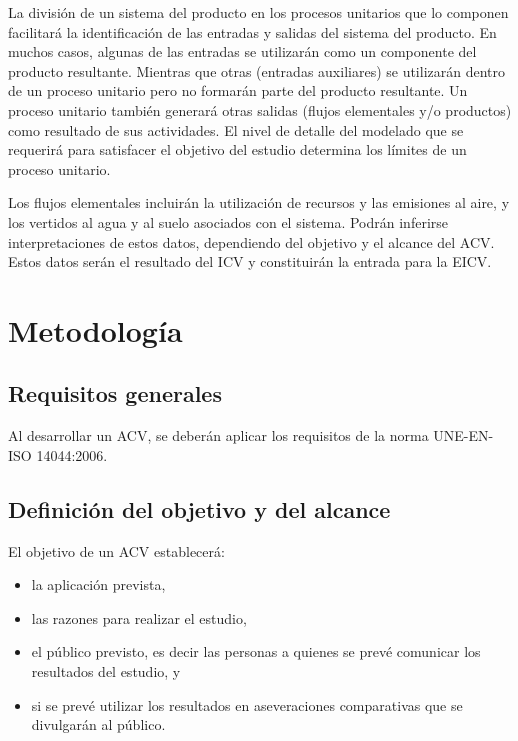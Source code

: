 La división de un sistema del producto en los procesos unitarios que lo componen facilitará la identificación de las entradas y salidas del sistema del producto. En muchos casos, algunas de las entradas se utilizarán como un componente del producto resultante. Mientras que otras (entradas auxiliares) se utilizarán dentro de un proceso unitario pero no formarán parte del producto resultante. Un proceso unitario también generará otras salidas (flujos elementales y/o productos) como resultado de sus actividades. El nivel de detalle del modelado que se requerirá para satisfacer el objetivo del estudio determina los límites de un proceso unitario.

Los flujos elementales incluirán la utilización de recursos y las emisiones al aire, y los vertidos al agua y al suelo asociados con el sistema. Podrán inferirse interpretaciones de estos datos, dependiendo del objetivo y el alcance del ACV. Estos datos serán el resultado del ICV y constituirán la entrada para la EICV.

\section{Metodología}
\subsection{Requisitos generales}

Al desarrollar un ACV, se deberán aplicar los requisitos de la norma UNE-EN-ISO 14044:2006.

\subsection{Definición del objetivo y del alcance}
El objetivo de un ACV establecerá:
\begin{itemize}
  \item la aplicación prevista,
  \item las razones para realizar el estudio,
  \item el público previsto, es decir las personas a quienes se prevé comunicar los resultados del estudio, y
  \item si se prevé utilizar los resultados en aseveraciones comparativas que se divulgarán al público.
\end{itemize}

